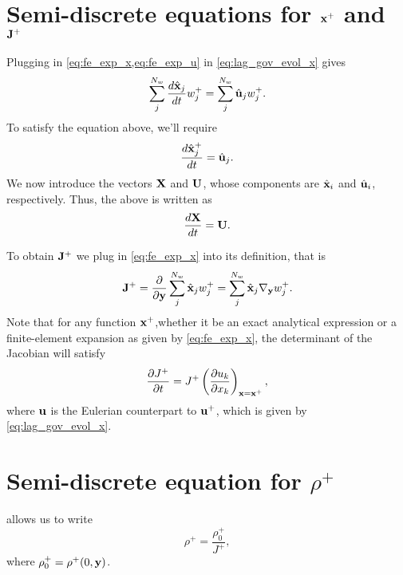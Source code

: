 \documentclass[11pt]{article}
\begin{document}
\section{Semi-discrete equations for $\mathbf{x}^+$ and $\mathbf{J}^+$}
Plugging in \cref{eq:fe_exp_x,eq:fe_exp_u} in \cref{eq:lag_gov_evol_x} gives
\begin{equation}
    \sum_{j}^{N_w} \frac{d \hat{\mathbf{x}}_j}{dt} w^+_j = \sum_{j}^{N_w} \hat{\mathbf{u}}_j w^+_j.
\end{equation}
To satisfy the equation above, we'll require
\begin{equation}
    \frac{d \hat{\mathbf{x}}^+_j}{dt} = \hat{\mathbf{u}}_j.
\end{equation}
We now introduce the vectors $\mathbf{X}$ and $\mathbf{U}$, whose components are $\hat{\mathbf{x}}_i$ and $\hat{\mathbf{u}}_i$, respectively. Thus, the above is written as
\begin{equation}
    \frac{d\mathbf{X}}{dt} = \mathbf{U}.
\end{equation}

To obtain $\mathbf{J}^+$ we plug in \cref{eq:fe_exp_x} into its definition, that is
\begin{equation}
    \mathbf{J}^+ = \frac{\partial}{\partial \mathbf{y}} \sum_j^{N_w} \hat{\mathbf{x}}_j w^+_j = \sum_j^{N_w} \hat{\mathbf{x}}_j \nabla_{\mathbf{y}} w^+_j.
\end{equation}
Note that for any function $\mathbf{x}^+$,whether it be an exact analytical expression or a finite-element expansion as given by \cref{eq:fe_exp_x}, the determinant of the Jacobian will satisfy
\begin{equation}
    \frac{\partial J^+}{\partial t} = J^+ \left ( \frac{\partial u_k}{\partial x_k} \right )_{\mathbf{x} = \mathbf{x}^+},
\end{equation}
where $\mathbf{u}$ is the Eulerian counterpart to $\mathbf{u}^+$, which is given by \cref{eq:lag_gov_evol_x}.

\section{Semi-discrete equation for $\rho^+$}
 allows us to write
\begin{equation}
    \label{eq:evol_rho_semi_discrete}
    \rho^+ = \frac{\rho^+_0}{J^+},
\end{equation}
where $\rho^+_0 = \rho^+(0,\mathbf{y})$.
\end{document}
